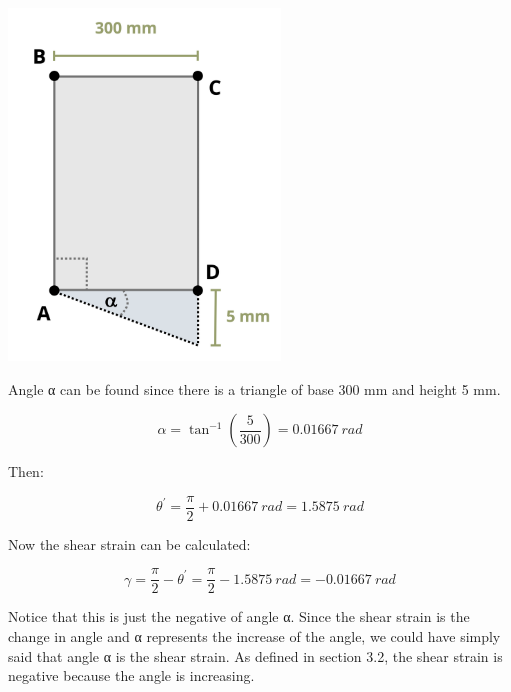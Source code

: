 \documentclass[
  letterpaper,
  DIV=11,
  numbers=noendperiod]{scrreprt}
\theoremstyle{definition}
\theoremstyle{remark}
\begin{document}
\begin{tcolorbox}
\begin{tcolorbox}
\begin{center}
\includegraphics[width=2.84375in,height=\textheight]{images/CH3 PNGs/example 3.3 part 2.png}
\end{center}

Angle α can be found since there is a triangle of base 300 mm and height
5 mm.

\[
\alpha=\tan ^{-1}\left(\frac{5}{300}\right)=0.01667 {~rad}
\]

Then:

\[
\theta^{\prime}=\frac{\pi}{2}+0.01667{~rad}=1.5875 {~rad}
\]

Now the shear strain can be calculated:

\[
\gamma=\frac{\pi}{2}-\theta^{\prime}=\frac{\pi}{2}-1.5875{~rad}=-0.01667 {~rad}
\]

Notice that this is just the negative of angle α. Since the shear strain
is the change in angle and α represents the increase of the angle, we
could have simply said that angle α is the shear strain. As defined in
section 3.2, the shear strain is negative because the angle is
increasing.

\end{tcolorbox}

\end{tcolorbox}
\end{document}

